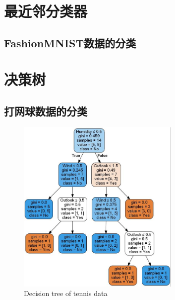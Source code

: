 \documentclass[a4paper,UTF8,openany]{book}
\begin{document}
\chapter{最近邻分类器}
\section{FashionMNIST数据的分类}


\chapter{决策树}
\section{打网球数据的分类}
\begin{figure}[ht]

	\centering
	\includegraphics[width=0.7\textwidth]{../Decision_Tree/tree.jpg}
	\caption{Decision tree of tennis data}
	\label{fig:label}
\end{figure}


\lstset{language=Python}
\lstset{frame=lines}
\lstset{basicstyle=\footnotesize}



\newpage
\end{document}
